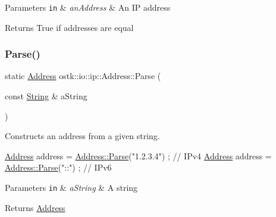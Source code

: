 \begin{DoxyParams}[1]{Parameters}
\mbox{\tt in}  & {\em an\+Address} & An IP address \\
\hline
\end{DoxyParams}
\begin{DoxyReturn}{Returns}
True if addresses are equal 
\end{DoxyReturn}
\mbox{\label{classostk_1_1io_1_1ip_1_1_address_a3d60e44d816e30f17db36f9bb7ac6307}} 
\subsubsection{\texorpdfstring{Parse()}{Parse()}}
{\footnotesize\ttfamily static \hyperlink{classostk_1_1io_1_1ip_1_1_address}{Address} ostk\+::io\+::ip\+::\+Address\+::\+Parse (\begin{DoxyParamCaption}\item[{const \hyperlink{namespaceostk_1_1io_1_1ip_a987b35b1bc61a18b66c2a45f9ce5536e}{String} \&}]{a\+String }\end{DoxyParamCaption})\hspace{0.3cm}{\ttfamily [static]}}



Constructs an address from a given string. 


\begin{DoxyCode}
\hyperlink{classostk_1_1io_1_1ip_1_1_address_a4118f42388b11fb003c9fb782f4ca04f}{Address} address = \hyperlink{classostk_1_1io_1_1ip_1_1_address_a3d60e44d816e30f17db36f9bb7ac6307}{Address::Parse}(\textcolor{stringliteral}{"1.2.3.4"}) ; \textcolor{comment}{// IPv4}
\hyperlink{classostk_1_1io_1_1ip_1_1_address_a4118f42388b11fb003c9fb782f4ca04f}{Address} address = \hyperlink{classostk_1_1io_1_1ip_1_1_address_a3d60e44d816e30f17db36f9bb7ac6307}{Address::Parse}(\textcolor{stringliteral}{"::"}) ; \textcolor{comment}{// IPv6}
\end{DoxyCode}



\begin{DoxyParams}[1]{Parameters}
\mbox{\tt in}  & {\em a\+String} & A string \\
\hline
\end{DoxyParams}
\begin{DoxyReturn}{Returns}
\hyperlink{classostk_1_1io_1_1ip_1_1_address}{Address} 
\end{DoxyReturn}
\mbox{\label{classostk_1_1io_1_1ip_1_1_address_a3e429f06ca69746fb73c155a8a4857b7}} 
